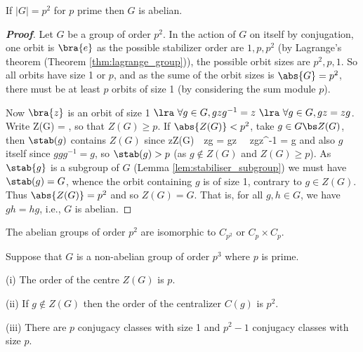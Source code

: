 \begin{proposition}\label{pro:p2_abelian}
If $|G| = p^2$ for $p$ prime then $G$ is abelian.
\end{proposition}
\begin{proof}[\bf Proof]
Let $G$ be a group of order $p^2$. In the action of $G$ on itself by conjugation, one orbit is $\bra{e}$ as the possible stabilizer order are $1,p,p^2$ (by Lagrange's theorem (Theorem \ref{thm:lagrange_group})), the possible orbit sizes are $p^2,p,1$. So all orbits have size 1 or $p$, and as the sume of the orbit sizes is $\abs{G}= p^2$, there must be at least $p$ orbits of size 1 (by considering the sum module $p$).

Now $\bra{z}$ is an orbit of size 1 $\lra \ \forall g\in G, gzg^{-1} =z \ \lra\ \forall g\in G,gz =zg$. Write
\be
Z(G) = ,
\ee
so that $Z(G)\geq p$. If $\abs{Z(G)} < p^2$, take $g\in G\bs Z(G)$, then $\stab(g)$ contains $Z(G)$ since
\be
z\in Z(G)\ \ra \ zg = gz \ \ra \ zgz^{-1} = g
\ee
and also $g$ itself since $ggg^{-1} = g$, so $\stab(g) >p$ (as $g\notin Z(G)$ and $Z(G)\geq p$). As $\stab{g}$ is a subgroup of $G$ (Lemma \ref{lem:stabiliser_subgroup}) we must have $\stab(g) = G$, whence the orbit containing $g$ is of size 1, contrary to $g\in Z(G)$. Thus $\abs{Z(G)}=p^2$ and so $Z(G) =G$. That is, for all $g,h\in G$, we have $gh = hg$, i.e., $G$ is abelian.
\end{proof}




\begin{remark}
The abelian groups of order $p^2$ are isomorphic to $C_{p^2}$ or $C_p \times C_p$.
\end{remark}

\begin{proposition}\label{pro:group_prime_cube}
Suppose that $G$ is a non-abelian group of order $p^3$ where $p$ is prime.
\ben
\item [(i)] The order of the centre $Z(G)$ is $p$.
\item [(ii)] If $g \notin Z(G)$ then the order of the centralizer $C(g)$ is $p^2$.
\item [(iii)] There are $p$ conjugacy classes with size 1 and $p^2 -1$ conjugacy classes with size $p$.
\een
\end{proposition}

